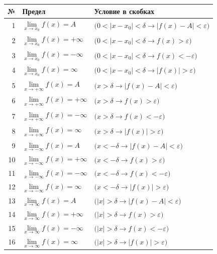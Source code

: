 \documentclass[a4paper,11pt]{article}
\newcommand{\eps}{\varepsilon}
\begin{document}
\begin{center}
\renewcommand{\arraystretch}{1.45}
\begin{tabular}{|r|l|l|}
\hline
\textbf{№} & \textbf{Предел} & \textbf{Условие в скобках} \\ \hline
1 & $\lim\limits_{x \to x_0} f(x) = A$ & $\bigl(0 < |x - x_0| < \delta \to |f(x) - A| < \eps\bigr)$ \\
2 & $\lim\limits_{x \to x_0} f(x) = +\infty$ & $\bigl(0 < |x - x_0| < \delta \to f(x) > \eps\bigr)$ \\
3 & $\lim\limits_{x \to x_0} f(x) = -\infty$ & $\bigl(0 < |x - x_0| < \delta \to f(x) < -\eps\bigr)$ \\
4 & $\lim\limits_{x \to x_0} f(x) = \infty$ & $\bigl(0 < |x - x_0| < \delta \to |f(x)| > \eps\bigr)$ \\ \hline
5 & $\lim\limits_{x \to +\infty} f(x) = A$ & $\bigl(x > \delta \to |f(x) - A| < \eps\bigr)$ \\
6 & $\lim\limits_{x \to +\infty} f(x) = +\infty$ & $\bigl(x > \delta \to f(x) > \eps\bigr)$ \\
7 & $\lim\limits_{x \to +\infty} f(x) = -\infty$ & $\bigl(x > \delta \to f(x) < -\eps\bigr)$ \\
8 & $\lim\limits_{x \to +\infty} f(x) = \infty$ & $\bigl(x > \delta \to |f(x)| > \eps\bigr)$ \\ \hline
9 & $\lim\limits_{x \to -\infty} f(x) = A$ & $\bigl(x < -\delta \to |f(x) - A| < \eps\bigr)$ \\
10 & $\lim\limits_{x \to -\infty} f(x) = +\infty$ & $\bigl(x < -\delta \to f(x) > \eps\bigr)$ \\
11 & $\lim\limits_{x \to -\infty} f(x) = -\infty$ & $\bigl(x < -\delta \to f(x) < -\eps\bigr)$ \\
12 & $\lim\limits_{x \to -\infty} f(x) = \infty$ & $\bigl(x < -\delta \to |f(x)| > \eps\bigr)$ \\ \hline
13 & $\lim\limits_{x \to \infty} f(x) = A$ & $\bigl(|x| > \delta \to |f(x) - A| < \eps\bigr)$ \\
14 & $\lim\limits_{x \to \infty} f(x) = +\infty$ & $\bigl(|x| > \delta \to f(x) > \eps\bigr)$ \\
15 & $\lim\limits_{x \to \infty} f(x) = -\infty$ & $\bigl(|x| > \delta \to f(x) < -\eps\bigr)$ \\
16 & $\lim\limits_{x \to \infty} f(x) = \infty$ & $\bigl(|x| > \delta \to |f(x)| > \eps\bigr)$ \\ \hline
\end{tabular}
\end{center}
\end{document}
